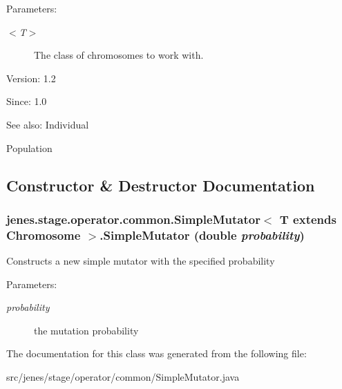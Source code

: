 \begin{Desc}
\item[Parameters:]
\begin{description}
\item[{\em $<$T$>$}]The class of chromosomes to work with.\end{description}
\end{Desc}
\begin{Desc}
\item[Version:]1.2 \end{Desc}
\begin{Desc}
\item[Since:]1.0\end{Desc}
\begin{Desc}
\item[See also:]Individual 

Population \end{Desc}


\subsection{Constructor \& Destructor Documentation}
\hypertarget{classjenes_1_1stage_1_1operator_1_1common_1_1_simple_mutator_3_01_t_01extends_01_chromosome_01_4_5872d2360575c78f7b010aaee5ba5b30}{
\subsubsection[SimpleMutator]{\setlength{\rightskip}{0pt plus 5cm}jenes.stage.operator.common.SimpleMutator$<$ T extends Chromosome $>$.SimpleMutator (double {\em probability})}}
\label{classjenes_1_1stage_1_1operator_1_1common_1_1_simple_mutator_3_01_t_01extends_01_chromosome_01_4_5872d2360575c78f7b010aaee5ba5b30}


Constructs a new simple mutator with the specified probability

\begin{Desc}
\item[Parameters:]
\begin{description}
\item[{\em probability}]the mutation probability \end{description}
\end{Desc}


The documentation for this class was generated from the following file:\begin{CompactItemize}
\item 
src/jenes/stage/operator/common/SimpleMutator.java\end{CompactItemize}
